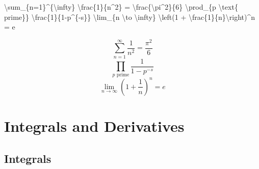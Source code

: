 \documentclass[
  letterpaper,
  DIV=11,
  numbers=noendperiod]{scrartcl}
\newenvironment{Shaded}{\begin{snugshade}}{\end{snugshade}}
\newcommand{\NormalTok}[1]{\textcolor[rgb]{0.00,0.23,0.31}{#1}}
\newcommand{\SpecialCharTok}[1]{\textcolor[rgb]{0.37,0.37,0.37}{#1}}
\newcommand{\SpecialStringTok}[1]{\textcolor[rgb]{0.13,0.47,0.30}{#1}}
\begin{document}
\begin{Shaded}
\begin{Highlighting}[]
\SpecialStringTok{$$}\SpecialCharTok{\textbackslash{}sum}\SpecialStringTok{\_\{n=1\}\^{}\{}\SpecialCharTok{\textbackslash{}infty}\SpecialStringTok{\} }\SpecialCharTok{\textbackslash{}frac}\SpecialStringTok{\{1\}\{n\^{}2\} = }\SpecialCharTok{\textbackslash{}frac}\SpecialStringTok{\{}\SpecialCharTok{\textbackslash{}pi}\SpecialStringTok{\^{}2\}\{6\}$$}
\SpecialStringTok{$$}\SpecialCharTok{\textbackslash{}prod}\SpecialStringTok{\_\{p }\SpecialCharTok{\textbackslash{}text}\NormalTok{\{ prime\}}\SpecialStringTok{\} }\SpecialCharTok{\textbackslash{}frac}\SpecialStringTok{\{1\}\{1{-}p\^{}\{{-}s\}\}$$}
\SpecialStringTok{$$}\SpecialCharTok{\textbackslash{}lim}\SpecialStringTok{\_\{n }\SpecialCharTok{\textbackslash{}to}\SpecialStringTok{ }\SpecialCharTok{\textbackslash{}infty}\SpecialStringTok{\} }\SpecialCharTok{\textbackslash{}left}\SpecialStringTok{(1 + }\SpecialCharTok{\textbackslash{}frac}\SpecialStringTok{\{1\}\{n\}}\SpecialCharTok{\textbackslash{}right}\SpecialStringTok{)\^{}n = e$$}
\end{Highlighting}
\end{Shaded}

\[\sum_{n=1}^{\infty} \frac{1}{n^2} = \frac{\pi^2}{6}\]
\[\prod_{p \text{ prime}} \frac{1}{1-p^{-s}}\]
\[\lim_{n \to \infty} \left(1 + \frac{1}{n}\right)^n = e\]

\hypertarget{integrals-and-derivatives}{%
\section{Integrals and Derivatives}\label{integrals-and-derivatives}}

\hypertarget{integrals}{%
\subsection{Integrals}\label{integrals}}
\end{document}
